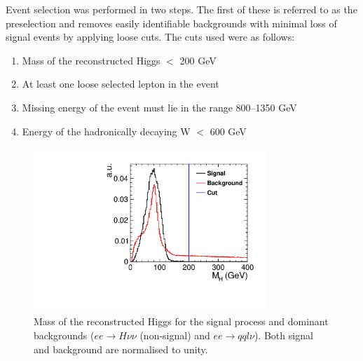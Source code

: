 Event selection was performed in two steps. The first of these is referred to as the preselection and removes easily identifiable backgrounds with minimal loss of signal events by applying loose cuts. The cuts used were as follows:

\begin{enumerate}

\item Mass of the reconstructed Higgs $<$ 200 GeV
\item At least one loose selected lepton in the event
\item Missing energy of the event must lie in the range 800--1350 GeV
\item Energy of the hadronically decaying W $<$ 600 GeV

\end{enumerate}


\begin{figure}
  \centering
  \includegraphics[width=0.78\textwidth,keepaspectratio]{HiggsAnalysis/figures/PseudoHiggs_PreSelection}
  \caption[Reconstructed Higgs mass for signal and background events]{Mass of the reconstructed Higgs for the signal process and dominant backgrounds ($ee\rightarrow H\nu\nu$ (non-signal) and $ee\rightarrow qql\nu$). Both signal and background are normalised to unity.}
  \label{fig:HMassPreSel}
\end{figure}

